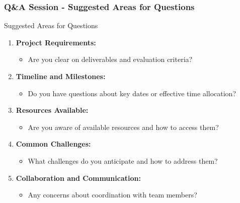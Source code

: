 \documentclass{beamer}
\begin{document}
\begin{frame}[fragile]
    \frametitle{Q\&A Session - Suggested Areas for Questions}
    \begin{block}{Suggested Areas for Questions}
        \begin{enumerate}
            \item \textbf{Project Requirements:}
                \begin{itemize}
                    \item Are you clear on deliverables and evaluation criteria?
                \end{itemize}
            \item \textbf{Timeline and Milestones:}
                \begin{itemize}
                    \item Do you have questions about key dates or effective time allocation?
                \end{itemize}
            \item \textbf{Resources Available:}
                \begin{itemize}
                    \item Are you aware of available resources and how to access them?
                \end{itemize}
            \item \textbf{Common Challenges:}
                \begin{itemize}
                    \item What challenges do you anticipate and how to address them?
                \end{itemize}
            \item \textbf{Collaboration and Communication:}
                \begin{itemize}
                    \item Any concerns about coordination with team members?
                \end{itemize}
        \end{enumerate}
    \end{block}
\end{frame}
\end{document}
